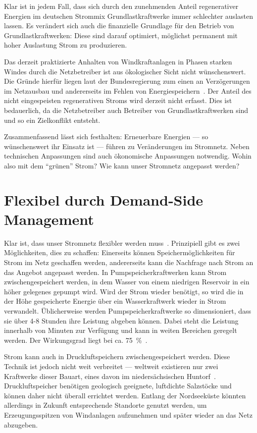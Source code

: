 \documentclass[12pt,BCOR=8.5mm]{scrartcl}
\begin{document}
Klar ist in jedem Fall, dass sich durch den zunehmenden Anteil
regenerativer Energien im deutschen Strommix Grundlastkraftwerke immer
schlechter auslasten lassen.  Es verändert sich auch die finanzielle
Grundlage für den Betrieb von Grundlastkraftwerken: Diese sind darauf
optimiert, möglichst permanent mit hoher Auslastung Strom zu
produzieren. 

Das derzeit praktizierte Anhalten von Windkraftanlagen in Phasen starken
Windes durch die Netzbetreiber ist aus ökologischer Sicht nicht
wünschenswert. Die Gründe hierfür liegen laut der Bundesregierung zum
einen an Verzögerungen im Netzausbau und andererseits im Fehlen von
Energiespeichern~\cite{bundesreg2010kleineanfrage}. Der Anteil des nicht
eingespeisten regenerativen Stroms wird derzeit nicht erfasst. Dies ist
bedauerlich, da die Netzbetreiber auch Betreiber von
Grundlastkraftwerken sind und so ein Zielkonflikt entsteht.

Zusammenfassend lässt sich festhalten: Erneuerbare Energien --- so
wünschenswert ihr Einsatz ist --- führen zu Veränderungen im Stromnetz.
Neben technischen Anpassungen sind auch ökonomische Anpassungen
notwendig. Wohin also mit dem "`grünen"' Strom? Wie kann unser Stromnetz
angepasst werden?

\section{Flexibel durch Demand-Side Management}\label{sec:demand-side_management}

Klar ist, dass unser Stromnetz flexibler werden
muss~\cite{geller2010smartgrid}. Prinzipiell gibt es zwei Möglichkeiten,
dies zu schaffen: Einerseits können Speichermöglichkeiten für Strom im
Netz geschaffen werden, andererseits kann die Nachfrage nach Strom an
das Angebot angepasst werden. In Pumpspeicherkraftwerken kann Strom
zwischengespeichert werden, in dem Wasser von einem niedrigen Reservoir
in ein höher gelegenes gepumpt wird.  Wird der Strom wieder benötigt, so
wird die in der Höhe gespeicherte Energie über ein Wasserkraftwerk
wieder in Strom verwandelt.  Üblicherweise werden Pumpspeicherkraftwerke
so dimensioniert, dass sie über 4-8 Stunden ihre Leistung abgeben
können. Dabei steht die Leistung innerhalb von Minuten zur Verfügung und
kann in weiten Bereichen geregelt werden. Der Wirkungsgrad liegt bei ca.
75~\%~\cite[S. 175]{schwab06elektroenergiesysteme}.

Strom kann auch in Druckluftspeichern zwischengespeichert werden. Diese
Technik ist jedoch nicht weit verbreitet --- weltweit existieren nur
zwei Kraftwerke dieser Bauart, eines davon im niedersächsischen
Huntorf~\cite{web11huntorf}. Druckluftspeicher benötigen geologisch geeignete,
luftdichte Salzstöcke und können daher nicht überall errichtet werden.
Entlang der Nordseeküste könnten allerdings in Zukunft entsprechende
Standorte genutzt werden, um Erzeugungsspitzen von Windanlagen
aufzunehmen und später wieder an das Netz abzugeben. 
\end{document}
